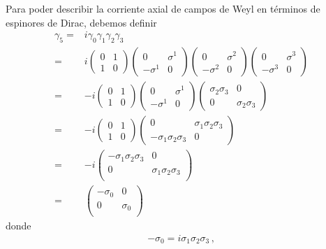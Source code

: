 Para poder describir la corriente axial de campos de Weyl en términos de espinores de Dirac, debemos definir
\begin{align}
  \gamma_5=&i\gamma_0\gamma_1\gamma_2\gamma_3 \nonumber\\
=&i
\begin{pmatrix}
0 & 1\\
1 & 0  
\end{pmatrix}
\begin{pmatrix}
0 & \sigma^1\\
-\sigma^1 & 0  
\end{pmatrix}
\begin{pmatrix}
0 & \sigma^2\\
-\sigma^2 & 0  
\end{pmatrix}
\begin{pmatrix}
0 & \sigma^3\\
-\sigma^3 & 0  
\end{pmatrix}\nonumber\\
=&-i\begin{pmatrix}
0 & 1\\
1 & 0  
\end{pmatrix}
\begin{pmatrix}
0 & \sigma^1\\
-\sigma^1 & 0  
\end{pmatrix}
\begin{pmatrix}
\sigma_2\sigma_3 & 0\\
0 & \sigma_2\sigma_3
\end{pmatrix}\nonumber\\
=&-i\begin{pmatrix}
0 & 1\\
1 & 0  
\end{pmatrix}
\begin{pmatrix}
0 & \sigma_1\sigma_2\sigma_3 \\
-\sigma_1\sigma_2\sigma_3 & 0
\end{pmatrix}\nonumber\\
=&-i\begin{pmatrix}
-\sigma_1\sigma_2\sigma_3 & 0 \\
0 &\sigma_1\sigma_2\sigma_3\\
\end{pmatrix}\nonumber\\
=&\begin{pmatrix}
-\sigma_0 & 0 \\
0 &\sigma_0\\
\end{pmatrix}
\end{align}
donde
\begin{align}
  -\sigma_0=i\sigma_1\sigma_2\sigma_3\,,
\end{align}

